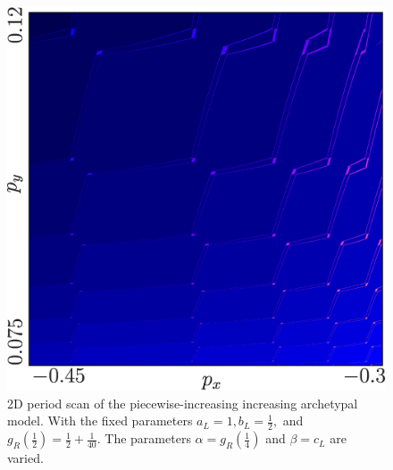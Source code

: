 \begin{figure}
	\centering
	\includegraphics[width=.6 \textwidth]{../Figures/7/7.1/result.png}
	\caption[2D period scan of the piecewise-increasing increasing archetypal model]{
		2D period scan of the piecewise-increasing increasing archetypal model.
		With the fixed parameters $a_L = 1, b_L = \frac{1}{2},$ and $g_R\left(\frac{1}{2}\right) = \frac{1}{2} + \frac{1}{40}$.
		The parameters $\alpha = g_R\left(\frac{1}{4}\right)$ and $\beta = c_L$ are varied.
	}
	\label{fig:add.arch.new.period}
\end{figure}

